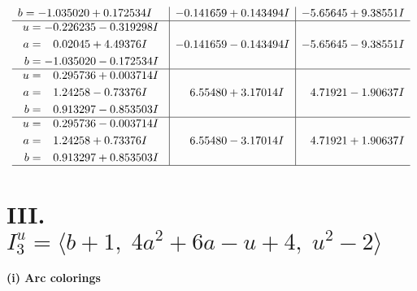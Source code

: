 \documentclass[1p]{elsarticle_modified}
\theoremstyle{definition}
\begin{document}
$$\begin{array}{c|c|c}
\begin{aligned}
b &= -1.035020 + 0.172534 I\end{aligned}
 & -0.141659 + 0.143494 I & -5.65645 + 9.38551 I \\ \hline\begin{aligned}
u &= -0.226235 - 0.319298 I \\
a &= \phantom{-}0.02045 + 4.49376 I \\
b &= -1.035020 - 0.172534 I\end{aligned}
 & -0.141659 - 0.143494 I & -5.65645 - 9.38551 I \\ \hline\begin{aligned}
u &= \phantom{-}0.295736 + 0.003714 I \\
a &= \phantom{-}1.24258 - 0.73376 I \\
b &= \phantom{-}0.913297 - 0.853503 I\end{aligned}
 & \phantom{-}6.55480 + 3.17014 I & \phantom{-}4.71921 - 1.90637 I \\ \hline\begin{aligned}
u &= \phantom{-}0.295736 - 0.003714 I \\
a &= \phantom{-}1.24258 + 0.73376 I \\
b &= \phantom{-}0.913297 + 0.853503 I\end{aligned}
 & \phantom{-}6.55480 - 3.17014 I & \phantom{-}4.71921 + 1.90637 I\\
 \hline 
 \end{array}$$\newpage\newpage\renewcommand{\arraystretch}{1}
\centering \section*{III. $I^u_{3}= \langle b+1,\;4 a^2+6 a- u+4,\;u^2-2 \rangle$}
\flushleft \textbf{(i) Arc colorings}\\
\end{document}
